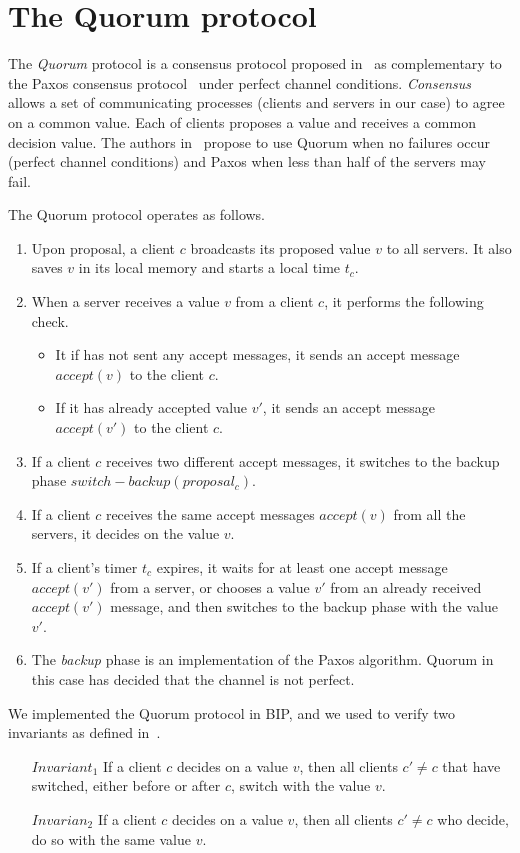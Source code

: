 \section{The Quorum protocol}
The {\em Quorum} protocol is a consensus protocol proposed in~\cite{guerraoui2012speculative}
as complementary to the Paxos consensus protocol~\cite{gafni2003disk} under perfect
channel conditions. {\em Consensus} allows a set of communicating processes
(clients and servers in our case) to agree on a common value. Each of clients proposes
a value and receives a common decision value. The authors in~\cite{guerraoui2012speculative}
propose to use Quorum when no failures occur (perfect channel conditions) and 
Paxos when less than half of the servers may fail. 

The Quorum protocol operates as follows.
\begin{enumerate}
 \item Upon proposal, a client $c$ broadcasts its proposed value 
 $v$ to all servers. It also saves $v$ in its local memory and starts a local time
 $t_c$. 
 \item When a server receives a value $v$ from a client $c$, it performs
 the following check.
 \begin{itemize}
  \item It if has not sent any accept messages, it sends an accept message
  $accept(v)$ to the client $c$. 
  \item If it has already accepted value $v'$, it sends an accept message
  $accept(v')$ to the client $c$. 
 \end{itemize}
 \item If a client $c$ receives two different accept messages, it switches
 to the backup phase $switch-backup(proposal_c)$.
 \item If a client $c$ receives the same accept messages $accept(v)$ from all the servers,
 it decides on the value $v$.
 \item If a client's timer $t_c$ expires, it waits for at least
 one accept message $accept(v')$ from a server, or chooses a value $v'$
 from an already received $accept(v')$ message, and then switches to 
 the backup phase with the value $v'$. 
 \item The {\em backup} phase is an implementation of the Paxos algorithm. Quorum in this
 case has decided that the channel is not perfect. 
\end{enumerate}

We implemented the Quorum protocol in BIP, and we used \biptool{} to verify 
two invariants as defined in~\cite{guerraoui2012speculative}.
\begin{enumerate}
 \item[$Invariant_1$] If a client $c$ decides on a value $v$, then all clients 
 $c' \neq c$ that have switched, either before or after $c$, switch with the value $v$.
 \item[$Invarian_2$] If a client $c$ decides on a value $v$, then all clients
 $c' \neq c$ who decide, do so with the same value $v$. 
\end{enumerate}

